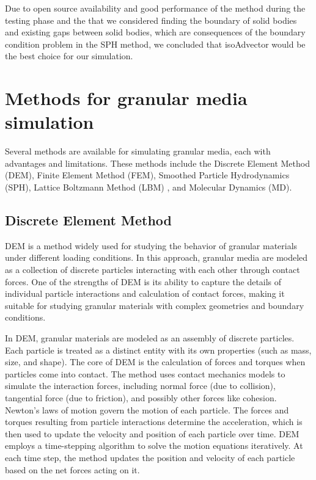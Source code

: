 Due to open source availability and good performance of the method during the testing phase and the that we considered finding the boundary of solid bodies and existing gaps between solid bodies, which are consequences of the boundary condition problem in the SPH method, we concluded that isoAdvector would be the best choice for our simulation.

\section{Methods for granular media simulation}

Several methods are available for simulating granular media, each with advantages and limitations. These methods include the Discrete Element Method (DEM)\cite{cundall1979discrete}, Finite Element Method (FEM), Smoothed Particle Hydrodynamics (SPH)\cite{monaghan1994SPH}, Lattice Boltzmann Method (LBM) \cite{chen1998lattice} \cite{begum2008lattice}, and Molecular Dynamics (MD).

\subsection{Discrete Element Method}
DEM is a method widely used for studying the behavior of granular materials under different loading conditions. In this approach, granular media are modeled as a collection of discrete particles interacting with each other through contact forces. One of the strengths of DEM is its ability to capture the details of individual particle interactions and calculation of contact forces, making it suitable for studying granular materials with complex geometries and boundary conditions.

In DEM, granular materials are modeled as an assembly of discrete particles. Each particle is treated as a distinct entity with its own properties (such as mass, size, and shape). The core of DEM is the calculation of forces and torques when particles come into contact. The method uses contact mechanics models to simulate the interaction forces, including normal force (due to collision), tangential force (due to friction), and possibly other forces like cohesion. Newton's laws of motion govern the motion of each particle. The forces and torques resulting from particle interactions determine the acceleration, which is then used to update the velocity and position of each particle over time. DEM employs a time-stepping algorithm to solve the motion equations iteratively. At each time step, the method updates the position and velocity of each particle based on the net forces acting on it. 

